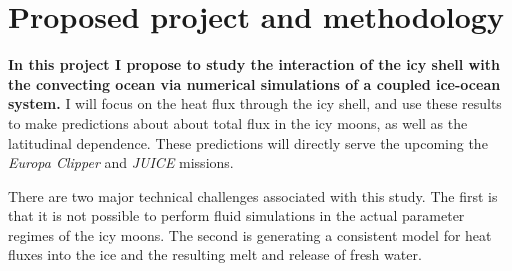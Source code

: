 \documentclass[12pt]{article}
\begin{document}
\section{Proposed project and methodology}

\textbf{In this project I propose to study the interaction of the icy shell with the convecting ocean via numerical simulations of a coupled ice-ocean system.} 
I will focus on the heat flux through the icy shell, and use these results to make predictions about about total flux in the icy moons, as well as the latitudinal dependence. These predictions will directly serve the upcoming the \textit{Europa Clipper} and \textit{JUICE} missions.

There are two major technical challenges associated with this study. The first is that it is not possible to perform fluid simulations in the actual parameter regimes of the icy moons. The second is generating a consistent model for heat fluxes into the ice and the resulting melt and release of fresh water.
\end{document}
